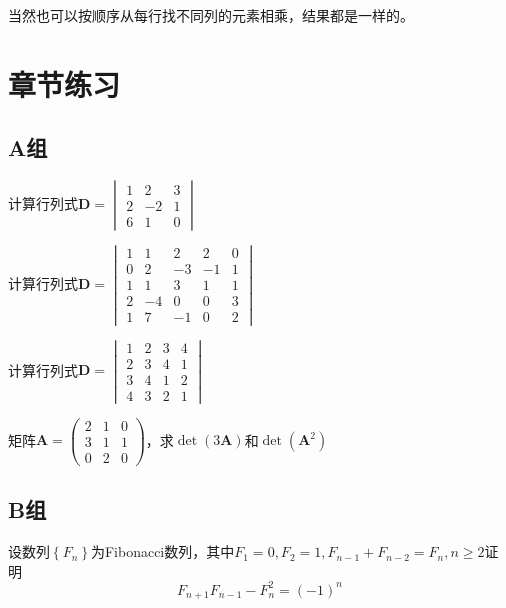 当然也可以按顺序从每行找不同列的元素相乘，结果都是一样的。

\section{章节练习}

\subsection{A组}

\begin{reidai}
	计算行列式$\mathbf{D}=\begin{vmatrix}
		1 & 2 & 3\\
		2 & -2 & 1\\
		6 & 1 & 0
	   \end{vmatrix}$
\end{reidai}

\begin{reidai}
	计算行列式$\mathbf{D}=\begin{vmatrix}
		1 & 1 & 2 & 2 & 0\\
		0 & 2 & -3 & -1 & 1\\
		1 & 1 & 3 & 1 & 1\\
		2 & -4 & 0 & 0 & 3\\
		1 & 7 & -1 & 0 & 2
	   \end{vmatrix}$
\end{reidai}

\begin{reidai}
	计算行列式$\mathbf{D}=\begin{vmatrix}
		1 & 2 & 3 & 4\\
		2 & 3 & 4 & 1\\
		3 & 4 & 1 & 2\\
		4 & 3 & 2 & 1
	   \end{vmatrix}$
\end{reidai}

\begin{reidai}
	矩阵$\mathbf{A}=\begin{pmatrix}
		2 & 1 & 0\\
		3 & 1 & 1\\
		0 & 2 & 0
	   \end{pmatrix}$，求$\det (3\mathbf{A})$和$\det (\mathbf{A}^2)$
\end{reidai}

\subsection{B组}

\begin{reidai}
	设数列$\left\{ F_n \right\}$为Fibonacci数列，其中$F_1=0,F_2=1,F_{n-1}+F_{n-2}=F_n,n\ge 2$证明$$F_{n+1}F_{n-1}-F_n^2=\left( -1 \right)^n$$
\end{reidai}